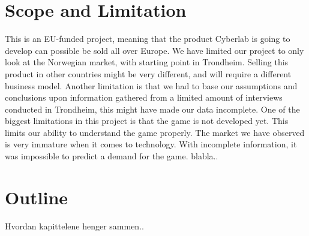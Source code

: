 \section{Scope and Limitation}
This is an EU-funded project, meaning that the product Cyberlab is going to develop can possible be sold all over Europe. We have limited our project to only look at the Norwegian market, with starting point in Trondheim. Selling this product in other countries might be very different, and will require a different business model. Another limitation is that we had to base our assumptions and conclusions upon information gathered from a limited amount of interviews conducted in Trondheim, this might have made our data incomplete.  One of the biggest limitations in this project is that the game is not developed yet. This limits our ability to understand the game properly. The market we have observed is very immature when it comes to technology. With incomplete information, it was impossible to predict a demand for the game. blabla..

\section{Outline}
Hvordan kapittelene henger sammen..
